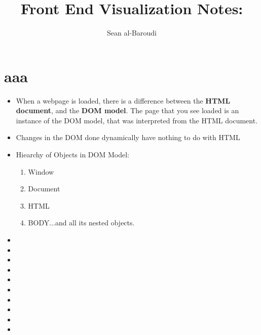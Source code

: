 \documentclass[8pt,a4paper]{extarticle}
\title{Front End Visualization Notes:}
\author{Sean al-Baroudi}
\begin{document}
\newcommand{\mitem}{\item[$\square$]}
\newcommand{\mmitem}{\item[$\triangledown$]}

\maketitle
\section*{aaa}

\begin{itemize}
\item When a webpage is loaded, there is a difference between the \textbf{HTML document}, and the \textbf{DOM model}. The page that you see loaded is an instance of the DOM model, that was interpreted from the HTML document. 
\item Changes in the DOM done dynamically have nothing to do with HTML
\item Hiearchy of Objects in DOM Model:
\begin{enumerate}
\item Window
\item Document
\item HTML
\item BODY...and all its nested objects.

\end{enumerate}
\item
\item
\item
\item
\item
\item
\item
\item
\item
\item

\end{itemize}
\end{document}
